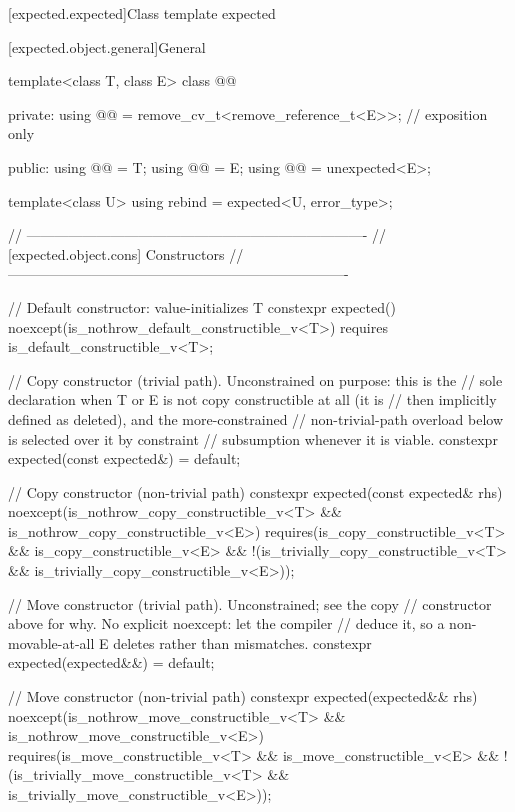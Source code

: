 [expected.expected]{Class template expected}

[expected.object.general]{General}

\begin{codeblock}
template<class T, class E>
class @@ {
private:
  using @@ = remove_cv_t<remove_reference_t<E>>; // exposition only

public:
  using @@ = T;
  using @@ = E;
  using @@ = unexpected<E>;

  template<class U> using rebind = expected<U, error_type>;

  // -------------------------------------------------------------------------
  // [expected.object.cons] Constructors
  // -------------------------------------------------------------------------

  // Default constructor: value-initializes T
  constexpr expected() noexcept(is_nothrow_default_constructible_v<T>)
    requires is_default_constructible_v<T>;

  // Copy constructor (trivial path). Unconstrained on purpose: this is the
  // sole declaration when T or E is not copy constructible at all (it is
  // then implicitly defined as deleted), and the more-constrained
  // non-trivial-path overload below is selected over it by constraint
  // subsumption whenever it is viable.
  constexpr expected(const expected&) = default;

  // Copy constructor (non-trivial path)
  constexpr expected(const expected& rhs) noexcept(is_nothrow_copy_constructible_v<T> &&
                                                   is_nothrow_copy_constructible_v<E>)
    requires(is_copy_constructible_v<T> && is_copy_constructible_v<E> &&
             !(is_trivially_copy_constructible_v<T> &&
               is_trivially_copy_constructible_v<E>));

  // Move constructor (trivial path). Unconstrained; see the copy
  // constructor above for why. No explicit noexcept: let the compiler
  // deduce it, so a non-movable-at-all E deletes rather than mismatches.
  constexpr expected(expected&&) = default;

  // Move constructor (non-trivial path)
  constexpr expected(expected&& rhs) noexcept(is_nothrow_move_constructible_v<T> &&
                                              is_nothrow_move_constructible_v<E>)
    requires(is_move_constructible_v<T> && is_move_constructible_v<E> &&
             !(is_trivially_move_constructible_v<T> &&
               is_trivially_move_constructible_v<E>));

}
\end{codeblock}
